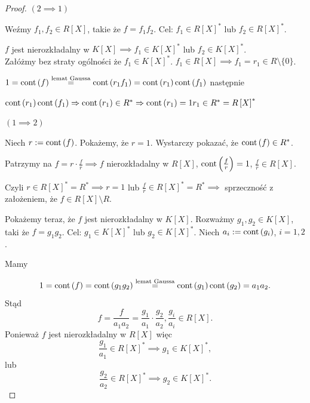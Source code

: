 \begin{proof}
	\noindent $\left( 2 \implies 1 \right) $

	Weźmy $f_1,f_2 \in R\left[ X \right] $, takie że $f = f_1f_2$. Cel: $f_1 \in R\left[ X \right]^{\ast}  $ lub $f_2 \in R\left[ X \right]^{\ast} $.

	$f$ jest nierozkładalny w $K\left[ X \right] \implies f_1 \in K\left[ X \right]^{\ast} $ lub $f_2 \in K\left[ X \right]^{\ast} $. \\
	Załóżmy bez straty ogólności że $f_1\in K\left[ X \right]^{\ast} $. $f_1 \in R\left[ X \right] \implies f_1 = r_1 \in R\setminus \{0\} $.

	$1 = \operatorname{cont} \left( f \right) \overset{\text{lemat Gaussa}}{=} \operatorname{cont} \left( r_1f_1 \right) = \operatorname{cont} \left( r_1 \right) \operatorname{cont} \left( f_1 \right) $
	następnie

	$\operatorname{cont} \left( r_1 \right) \operatorname{cont} \left( f_1 \right) \Rightarrow \operatorname{cont} \left( r_1 \right) \in R^{\ast} \Rightarrow \operatorname{cont} \left( r_1 \right) = 1 r_1 \in R^{\ast} = R\left[ X \right] ^{\ast} $

	\noindent $\left( 1 \implies 2 \right) $

	\noindent Niech $r := \operatorname{cont} \left( f \right) $. Pokażemy, że $r = 1$. Wystarczy pokazać, że  $\operatorname{cont} \left( f \right) \in R^{\ast} $.

	Patrzymy na $f = r\cdot \tfrac{f}{r} \implies f$ nierozkładalny w $R\left[ X \right] $, $\operatorname{cont} \left( \frac{f}{r} \right) = 1$, $\frac{f}{r} \in  R\left[ X \right] $.

	Czyli $r\in R\left[ X \right] ^{\ast} = R^{\ast} \implies r=1$ lub $\frac{f}{r}\in R\left[ X \right] ^{\ast} = R^{\ast} \implies$ sprzeczność z założeniem, że $f \in R\left[ X \right] \setminus R$.

	Pokażemy teraz, że $f$ jest nierozkładalny w $K\left[ X \right] $. Rozważmy $g_1,g_2 \in K\left[ X \right] $, taki że $f = g_1g_2$. Cel: $g_1 \in K\left[ X \right] ^{\ast} $ lub $g_2 \in K\left[ X \right] ^{\ast} $. Niech $a_{i} := \operatorname{cont} \left( g_{i} \right) $, $i = 1,2$.

	Mamy

	 \[
	1 = \operatorname{cont} \left( f \right) = \operatorname{cont} \left( g_1g_2 \right) \overset{\text{lemat Gaussa}}{=} \operatorname{cont} \left( g_1 \right) \operatorname{cont} \left( g_2 \right) = a_1a_2
	.\] 
	Stąd
	\[
	f = \frac{f}{a_1a_2} = \frac{g_1}{a_1}\cdot \frac{g_2}{a_2}, \frac{g_{i}}{a_{i}} \in R\left[ X \right] 
	.\] 
	Ponieważ $f$ jest nierozkładalny w $R\left[ X \right] $ więc
	\[
	\frac{g_1}{a_1} \in R\left[ X \right] ^{\ast} \implies g_1 \in K\left[ X \right] ^{\ast} 	
	,\] 
	lub
	\[
	\frac{g_2}{a_2} \in R\left[ X \right]^{\ast} \implies g_2 \in K\left[ X \right] ^{\ast} 
	.\] 
\end{proof} 
